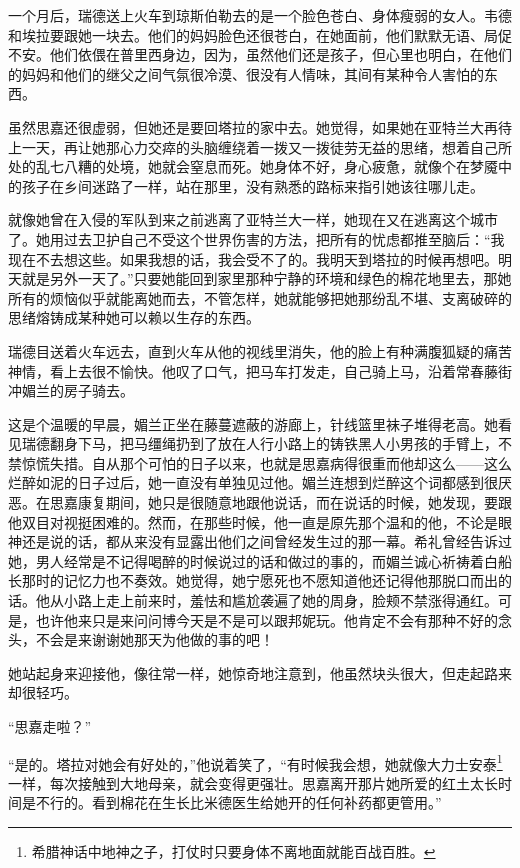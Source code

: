 \par 一个月后，瑞德送上火车到琼斯伯勒去的是一个脸色苍白、身体瘦弱的女人。韦德和埃拉要跟她一块去。他们的妈妈脸色还很苍白，在她面前，他们默默无语、局促不安。他们依偎在普里西身边，因为，虽然他们还是孩子，但心里也明白，在他们的妈妈和他们的继父之间气氛很冷漠、很没有人情味，其间有某种令人害怕的东西。
\par 虽然思嘉还很虚弱，但她还是要回塔拉的家中去。她觉得，如果她在亚特兰大再待上一天，再让她那心力交瘁的头脑缠绕着一拨又一拨徒劳无益的思绪，想着自己所处的乱七八糟的处境，她就会窒息而死。她身体不好，身心疲惫，就像个在梦魇中的孩子在乡间迷路了一样，站在那里，没有熟悉的路标来指引她该往哪儿走。
\par 就像她曾在入侵的军队到来之前逃离了亚特兰大一样，她现在又在逃离这个城市了。她用过去卫护自己不受这个世界伤害的方法，把所有的忧虑都推至脑后：“我现在不去想这些。如果我想的话，我会受不了的。我明天到塔拉的时候再想吧。明天就是另外一天了。”只要她能回到家里那种宁静的环境和绿色的棉花地里去，那她所有的烦恼似乎就能离她而去，不管怎样，她就能够把她那纷乱不堪、支离破碎的思绪熔铸成某种她可以赖以生存的东西。
\par 瑞德目送着火车远去，直到火车从他的视线里消失，他的脸上有种满腹狐疑的痛苦神情，看上去很不愉快。他叹了口气，把马车打发走，自己骑上马，沿着常春藤街冲媚兰的房子骑去。
\par 这是个温暖的早晨，媚兰正坐在藤蔓遮蔽的游廊上，针线篮里袜子堆得老高。她看见瑞德翻身下马，把马缰绳扔到了放在人行小路上的铸铁黑人小男孩的手臂上，不禁惊慌失措。自从那个可怕的日子以来，也就是思嘉病得很重而他却这么——这么烂醉如泥的日子过后，她一直没有单独见过他。媚兰连想到烂醉这个词都感到很厌恶。在思嘉康复期间，她只是很随意地跟他说话，而在说话的时候，她发现，要跟他双目对视挺困难的。然而，在那些时候，他一直是原先那个温和的他，不论是眼神还是说的话，都从来没有显露出他们之间曾经发生过的那一幕。希礼曾经告诉过她，男人经常是不记得喝醉的时候说过的话和做过的事的，而媚兰诚心祈祷着白船长那时的记忆力也不奏效。她觉得，她宁愿死也不愿知道他还记得他那脱口而出的话。他从小路上走上前来时，羞怯和尴尬袭遍了她的周身，脸颊不禁涨得通红。可是，也许他来只是来问问博今天是不是可以跟邦妮玩。他肯定不会有那种不好的念头，不会是来谢谢她那天为他做的事的吧！
\par 她站起身来迎接他，像往常一样，她惊奇地注意到，他虽然块头很大，但走起路来却很轻巧。
\par “思嘉走啦？”
\par “是的。塔拉对她会有好处的，”他说着笑了，“有时候我会想，她就像大力士安泰\footnote{希腊神话中地神之子，打仗时只要身体不离地面就能百战百胜。}一样，每次接触到大地母亲，就会变得更强壮。思嘉离开那片她所爱的红土太长时间是不行的。看到棉花在生长比米德医生给她开的任何补药都更管用。”
